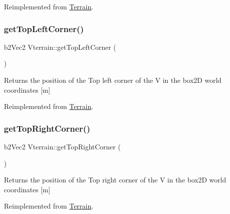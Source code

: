 Reimplemented from \mbox{\hyperlink{class_terrain_a26e1c7c05b8256015730df34d97d29c2}{Terrain}}.

\mbox{\label{class_vterrain_a2a6ee2632c67ebe63871e7954bb199b1}} 
\subsubsection{\texorpdfstring{get\+Top\+Left\+Corner()}{getTopLeftCorner()}}
{\footnotesize\ttfamily b2\+Vec2 Vterrain\+::get\+Top\+Left\+Corner (\begin{DoxyParamCaption}{ }\end{DoxyParamCaption})\hspace{0.3cm}{\ttfamily [virtual]}}

\begin{DoxyReturn}{Returns}
the position of the Top left corner of the V in the box2D world coordinates \mbox{[}m\mbox{]} 
\end{DoxyReturn}


Reimplemented from \mbox{\hyperlink{class_terrain_a8a8629396e5cb03961649acdc23eacf2}{Terrain}}.

\mbox{\label{class_vterrain_a27258a597b11a9cb78bd7e537fb037c4}} 
\subsubsection{\texorpdfstring{get\+Top\+Right\+Corner()}{getTopRightCorner()}}
{\footnotesize\ttfamily b2\+Vec2 Vterrain\+::get\+Top\+Right\+Corner (\begin{DoxyParamCaption}{ }\end{DoxyParamCaption})\hspace{0.3cm}{\ttfamily [virtual]}}

\begin{DoxyReturn}{Returns}
the position of the Top right corner of the V in the box2D world coordinates \mbox{[}m\mbox{]} 
\end{DoxyReturn}


Reimplemented from \mbox{\hyperlink{class_terrain_a10fcf414cba83e769d99156fe16aa795}{Terrain}}.

